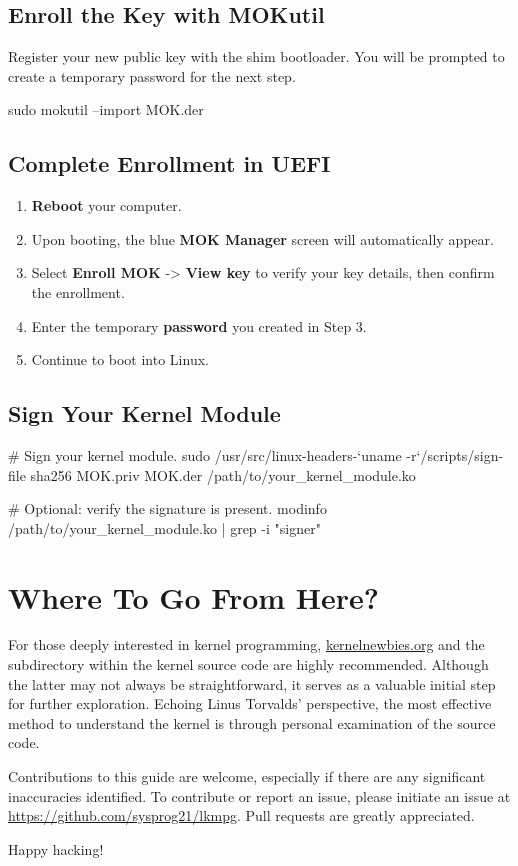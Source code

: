 \documentclass[10pt, oneside]{book}
\begin{document}
\subsection{Enroll the Key with MOKutil}
Register your new public key with the shim bootloader. You will be prompted to create a temporary password for the next step.

\begin{codebash}
sudo mokutil --import MOK.der
\end{codebash}

\subsection{Complete Enrollment in UEFI}

\begin{enumerate}
    \item \textbf{Reboot} your computer.
    \item Upon booting, the blue \textbf{MOK Manager} screen will automatically appear.
    \item Select \textbf{Enroll MOK} -> \textbf{View key} to verify your key details, then confirm the enrollment.
    \item Enter the temporary \textbf{password} you created in Step 3.
    \item Continue to boot into Linux.
\end{enumerate}

\subsection{Sign Your Kernel Module}

\begin{codebash}
# Sign your kernel module.
sudo /usr/src/linux-headers-`uname -r`/scripts/sign-file sha256 MOK.priv MOK.der /path/to/your_kernel_module.ko

# Optional: verify the signature is present.
modinfo /path/to/your_kernel_module.ko | grep -i "signer"
\end{codebash}

\section{Where To Go From Here?}
\label{sec:where_to_go}
For those deeply interested in kernel programming,
\href{https://kernelnewbies.org}{kernelnewbies.org} and the  subdirectory within the kernel source code are highly recommended.
Although the latter may not always be straightforward, it serves as a valuable initial step for further exploration.
Echoing Linus Torvalds' perspective, the most effective method to understand the kernel is through personal examination of the source code.

Contributions to this guide are welcome, especially if there are any significant inaccuracies identified.
To contribute or report an issue, please initiate an issue at \url{https://github.com/sysprog21/lkmpg}.
Pull requests are greatly appreciated.

Happy hacking!
\end{document}
